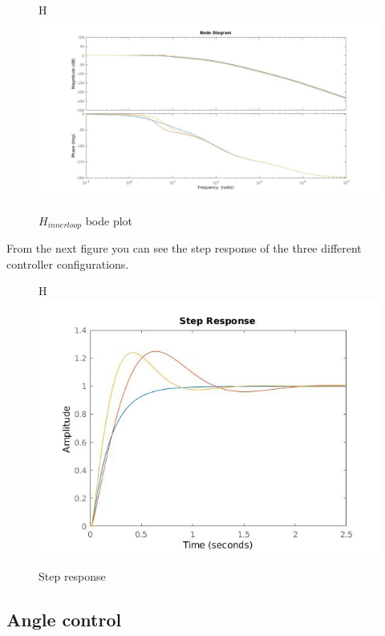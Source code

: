 \begin{figure}{H}
\centering
 	\includegraphics[width=1\textwidth]{figures/Hinnerbode.jpg}
	
	
	\caption{$H_{innerloop}$ bode plot} 
 	\label{fig:hinnerloopbode} 
\end{figure}

From the next figure you can see the step response of the three different controller configurations.

\begin{figure}{H}
\centering
 	\includegraphics[width=1\textwidth]{figures/stepresponse.jpg}
	
	
	\caption{Step response} 
 	\label{fig:stepresponse} 
\end{figure}

\subsection{Angle control}

